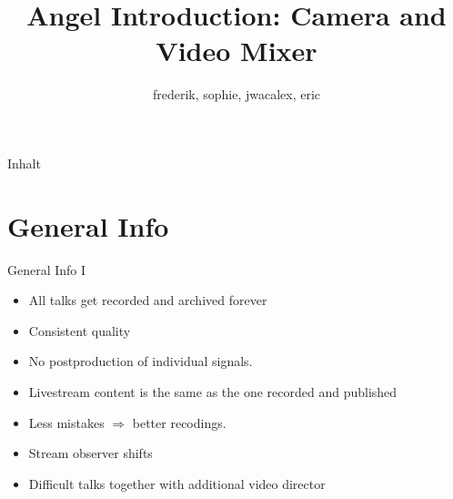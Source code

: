 \documentclass[aspectratio=169]{beamer}
\title{Angel Introduction: Camera and Video Mixer}
\author{frederik, sophie, jwacalex, eric}
\institute{C3VOC}
\begin{document}

\maketitle

\begin{frame}{Inhalt}
\tableofcontents
\end{frame}


\newpage





\section{General Info}
\begin{frame}{General Info I}
	\begin{itemize}
		\item All talks get recorded and archived forever
		\item Consistent quality
		\item No postproduction of individual signals.
		\item Livestream content is the same as the one recorded and published
		\item Less mistakes $\Rightarrow$ better recodings.
		\item Stream observer shifts
		\item Difficult talks together with additional video director%
	\end{itemize}
\end{frame}
\end{document}
